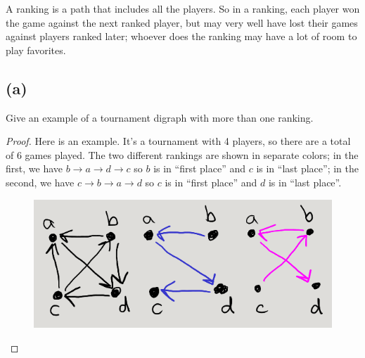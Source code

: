 \documentclass[14pt]{extarticle}
\begin{document}
A ranking is a path that includes all the players. So in a ranking, each player won the game against the next ranked player, but may very well have lost their games against players ranked later; whoever does the ranking may have a lot of room to play favorites.

\subsection{(a)}
Give an example of a tournament digraph with more than one ranking.

\begin{proof}
Here is an example. It's a tournament with 4 players, so there are a total of 6 games played. The two different rankings are shown in separate colors; in the first, we have $b \to a \to d \to c$ so $b$ is in ``first place'' and $c$ is in ``last place''; in the second, we have $c \to b \to a \to d$ so $c$ is in ``first place'' and $d$ is in ``last place''.

\begin{figure}[ht!]
\centering
\includegraphics[scale=0.5]{digraph.png}
\end{figure}
\end{proof}
\end{document}
